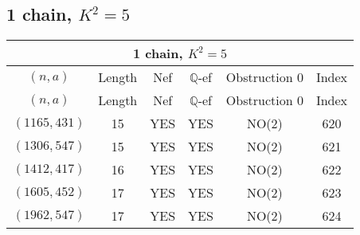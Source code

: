 \subsection{1 chain, $K^2 = 5$}
\begin{longtable}{|c|c|c|c|c|c|}
\hline
\multicolumn{6}{|c|}{1 chain, $K^2 = 5$}\\
\hline
$(n,a)$ & Length & Nef & $\mathbb Q$-ef & Obstruction 0 & Index\\
\hline
\endfirsthead

\hline
$(n,a)$ & Length & Nef & $\mathbb Q$-ef & Obstruction 0 & Index\\
\hline
\endhead
\hline
\endfoot

$(1165, 431)$ & 15 & YES & YES & NO(2) & 620\\
$(1306, 547)$ & 15 & YES & YES & NO(2) & 621\\
$(1412, 417)$ & 16 & YES & YES & NO(2) & 622\\
$(1605, 452)$ & 17 & YES & YES & NO(2) & 623\\
$(1962, 547)$ & 17 & YES & YES & NO(2) & 624
\end{longtable}
